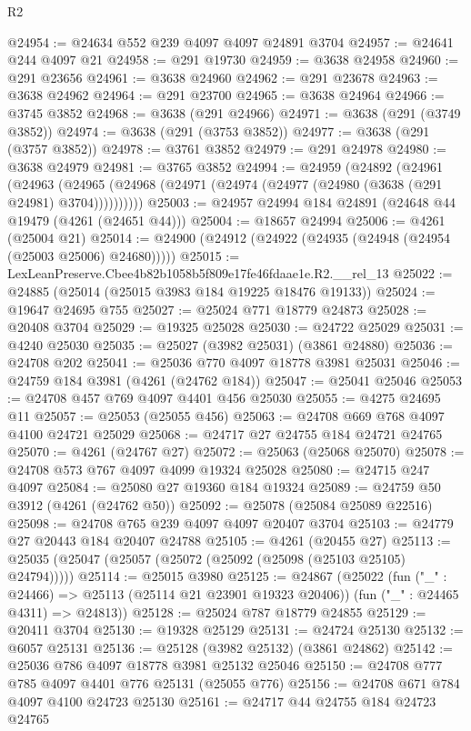 \begin{lexlean}{R2}
\begin{coremodule}
@24954 := @24634 @552 @239 @4097 @4097 @24891 @3704
@24957 := @24641 @244 @4097 @21
@24958 := @291 @19730
@24959 := @3638 @24958
@24960 := @291 @23656
@24961 := @3638 @24960
@24962 := @291 @23678
@24963 := @3638 @24962
@24964 := @291 @23700
@24965 := @3638 @24964
@24966 := @3745 @3852
@24968 := @3638 (@291 @24966)
@24971 := @3638 (@291 (@3749 @3852))
@24974 := @3638 (@291 (@3753 @3852))
@24977 := @3638 (@291 (@3757 @3852))
@24978 := @3761 @3852
@24979 := @291 @24978
@24980 := @3638 @24979
@24981 := @3765 @3852
@24994 := @24959
    (@24892
      (@24961
        (@24963 (@24965 (@24968 (@24971 (@24974 (@24977 (@24980 (@3638 (@291 @24981) @3704))))))))))
@25003 := @24957 @24994 @184 @24891 (@24648 @44 @19479 (@4261 (@24651 @44)))
@25004 := @18657 @24994
@25006 := @4261 (@25004 @21)
@25014 := @24900 (@24912 (@24922 (@24935 (@24948 (@24954 (@25003 @25006) @24680)))))
@25015 := LexLeanPreserve.Cbee4b82b1058b5f809e17fe46fdaae1e.R2.__rel_13
@25022 := @24885 (@25014 (@25015 @3983 @184 @19225 @18476 @19133))
@25024 := @19647 @24695 @755
@25027 := @25024 @771 @18779 @24873
@25028 := @20408 @3704
@25029 := @19325 @25028
@25030 := @24722 @25029
@25031 := @4240 @25030
@25035 := @25027 (@3982 @25031) (@3861 @24880)
@25036 := @24708 @202
@25041 := @25036 @770 @4097 @18778 @3981 @25031
@25046 := @24759 @184 @3981 (@4261 (@24762 @184))
@25047 := @25041 @25046
@25053 := @24708 @457 @769 @4097 @4401 @456 @25030
@25055 := @4275 @24695 @11
@25057 := @25053 (@25055 @456)
@25063 := @24708 @669 @768 @4097 @4100 @24721 @25029
@25068 := @24717 @27 @24755 @184 @24721 @24765
@25070 := @4261 (@24767 @27)
@25072 := @25063 (@25068 @25070)
@25078 := @24708 @573 @767 @4097 @4099 @19324 @25028
@25080 := @24715 @247 @4097
@25084 := @25080 @27 @19360 @184 @19324
@25089 := @24759 @50 @3912 (@4261 (@24762 @50))
@25092 := @25078 (@25084 @25089 @22516)
@25098 := @24708 @765 @239 @4097 @4097 @20407 @3704
@25103 := @24779 @27 @20443 @184 @20407 @24788
@25105 := @4261 (@20455 @27)
@25113 := @25035 (@25047 (@25057 (@25072 (@25092 (@25098 (@25103 @25105) @24794)))))
@25114 := @25015 @3980
@25125 := @24867
    (@25022
      (fun ("_" : @24466) => @25113 (@25114 @21 @23901 @19323 @20406))
      (fun ("_" : @24465 @4311) => @24813))
@25128 := @25024 @787 @18779 @24855
@25129 := @20411 @3704
@25130 := @19328 @25129
@25131 := @24724 @25130
@25132 := @6057 @25131
@25136 := @25128 (@3982 @25132) (@3861 @24862)
@25142 := @25036 @786 @4097 @18778 @3981 @25132 @25046
@25150 := @24708 @777 @785 @4097 @4401 @776 @25131 (@25055 @776)
@25156 := @24708 @671 @784 @4097 @4100 @24723 @25130
@25161 := @24717 @44 @24755 @184 @24723 @24765

\end{coremodule}
\end{lexlean}

